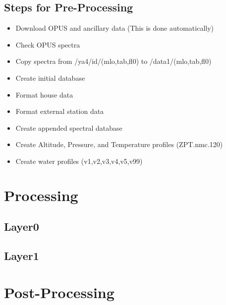 \documentclass[12pt, letterpaper]{article}
\begin{document}
\subsection{Steps for Pre-Processing}
\label{sec:SCSD}

\begin{itemize}
\item Download OPUS and ancillary data (This is done automatically)
\item Check OPUS spectra
\item Copy spectra from /ya4/id/(mlo,tab,fl0) to /data1/(mlo,tab,fl0)
\item Create initial database
\item Format house data
\item Format external station data
\item Create appended spectral database
\item Create Altitude, Pressure, and Temperature profiles (ZPT.nmc.120)
\item Create water profiles (v1,v2,v3,v4,v5,v99)
\end{itemize}


\section{Processing}
\subsection{Layer0}

\subsection{Layer1}


\section{Post-Processing}
\end{document}
